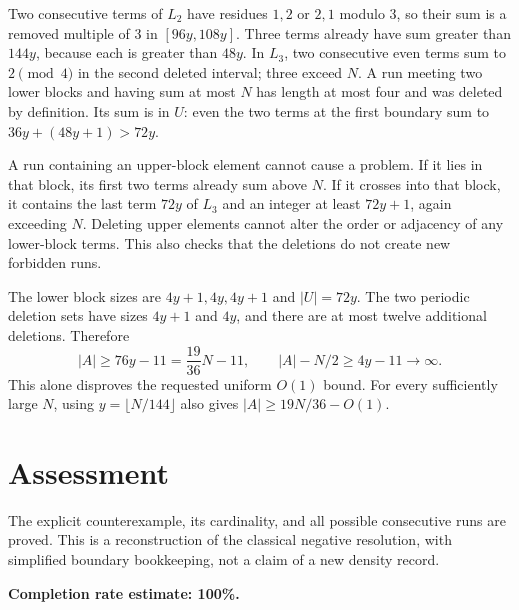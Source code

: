 \documentclass[11pt]{article}
\begin{document}
Two consecutive terms of $L_2$ have residues $1,2$ or $2,1$ modulo $3$, so their sum is a removed multiple of $3$ in $[96y,108y]$. Three terms already have sum greater than $144y$, because each is greater than $48y$. In $L_3$, two consecutive even terms sum to $2\pmod4$ in the second deleted interval; three exceed $N$. A run meeting two lower blocks and having sum at most $N$ has length at most four and was deleted by definition. Its sum is in $U$: even the two terms at the first boundary sum to $36y+(48y+1)>72y$.

A run containing an upper-block element cannot cause a problem. If it lies in that block, its first two terms already sum above $N$. If it crosses into that block, it contains the last term $72y$ of $L_3$ and an integer at least $72y+1$, again exceeding $N$. Deleting upper elements cannot alter the order or adjacency of any lower-block terms. This also checks that the deletions do not create new forbidden runs.

The lower block sizes are $4y+1,4y,4y+1$ and $|U|=72y$. The two periodic deletion sets have sizes $4y+1$ and $4y$, and there are at most twelve additional deletions. Therefore
\[
 |A|\ge76y-11=\frac{19}{36}N-11,
 \qquad |A|-N/2\ge4y-11\longrightarrow\infty.
\]
This alone disproves the requested uniform $O(1)$ bound. For every sufficiently large $N$, using $y=\lfloor N/144\rfloor$ also gives $|A|\ge19N/36-O(1)$.

\section*{Assessment}
The explicit counterexample, its cardinality, and all possible consecutive runs are proved. This is a reconstruction of the classical negative resolution, with simplified boundary bookkeeping, not a claim of a new density record.

\textbf{Completion rate estimate: 100\%.}
\end{document}
